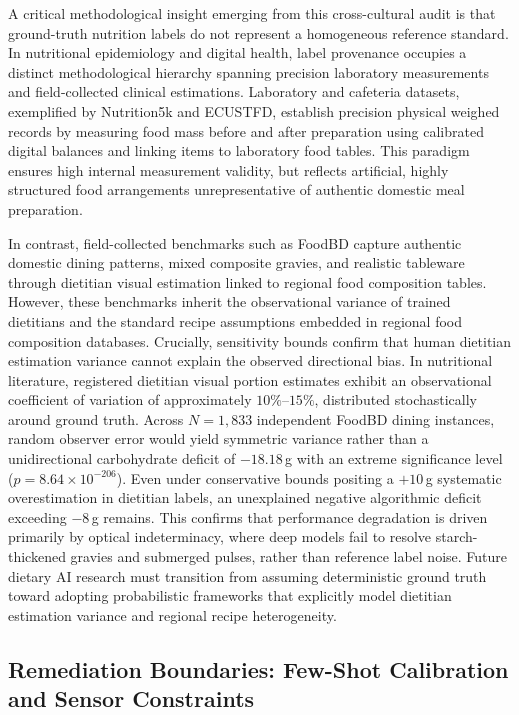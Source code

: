 \documentclass[utf8]{FrontiersinVancouver}
\begin{document}
A critical methodological insight emerging from this cross-cultural audit is that ground-truth nutrition labels do not represent a homogeneous reference standard. In nutritional epidemiology and digital health, label provenance occupies a distinct methodological hierarchy spanning precision laboratory measurements and field-collected clinical estimations. Laboratory and cafeteria datasets, exemplified by Nutrition5k and ECUSTFD, establish precision physical weighed records by measuring food mass before and after preparation using calibrated digital balances and linking items to laboratory food tables. This paradigm ensures high internal measurement validity, but reflects artificial, highly structured food arrangements unrepresentative of authentic domestic meal preparation.

In contrast, field-collected benchmarks such as FoodBD capture authentic domestic dining patterns, mixed composite gravies, and realistic tableware through dietitian visual estimation linked to regional food composition tables. However, these benchmarks inherit the observational variance of trained dietitians and the standard recipe assumptions embedded in regional food composition databases. Crucially, sensitivity bounds confirm that human dietitian estimation variance cannot explain the observed directional bias. In nutritional literature, registered dietitian visual portion estimates exhibit an observational coefficient of variation of approximately $10\%\text{--}15\%$, distributed stochastically around ground truth. Across $N=1,833$ independent FoodBD dining instances, random observer error would yield symmetric variance rather than a unidirectional carbohydrate deficit of $-18.18$\,g with an extreme significance level ($p = 8.64 \times 10^{-206}$). Even under conservative bounds positing a $+10$\,g systematic overestimation in dietitian labels, an unexplained negative algorithmic deficit exceeding $-8$\,g remains. This confirms that performance degradation is driven primarily by optical indeterminacy, where deep models fail to resolve starch-thickened gravies and submerged pulses, rather than reference label noise. Future dietary AI research must transition from assuming deterministic ground truth toward adopting probabilistic frameworks that explicitly model dietitian estimation variance and regional recipe heterogeneity.

\subsection{Remediation Boundaries: Few-Shot Calibration and Sensor Constraints}
\end{document}
